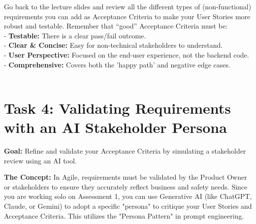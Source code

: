 \documentclass[a4paper,12pt]{article}
\begin{document}
\begin{enumerate}
    Go back to the lecture slides and review all the different types of (non-functional) requirements you can add as Acceptance Criteria to make your User Stories more robust and testable. Remember that ``good'' Acceptance Criteria must be: \\
    - \textbf{Testable:} There is a clear pass/fail outcome. \\
    - \textbf{Clear \& Concise:} Easy for non-technical stakeholders to understand. \\
    - \textbf{User Perspective:} Focused on the end-user experience, not the backend code. \\
    - \textbf{Comprehensive:} Covers both the 'happy path' and negative edge cases. \\ \\
\end{enumerate}


\section*{Task 4: Validating Requirements with an AI Stakeholder Persona}

\textbf{Goal:} Refine and validate your Acceptance Criteria by simulating a stakeholder review using an AI tool.

\textbf{The Concept:} In Agile, requirements must be validated by the Product Owner or stakeholders to ensure they accurately reflect business and safety needs. Since you are working solo on Assessment 1, you can use Generative AI (like ChatGPT, Claude, or Gemini) to adopt a specific "persona" to critique your User Stories and Acceptance Criteria. This utilizes the "Persona Pattern" in prompt engineering.
\end{document}
